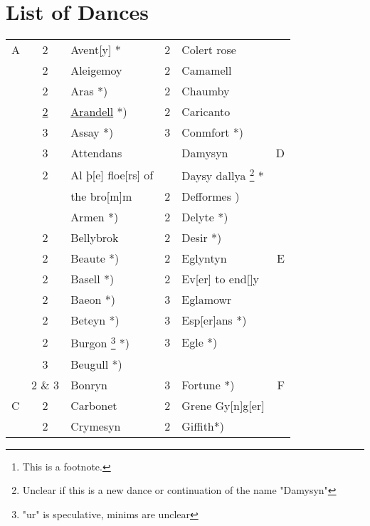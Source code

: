 \documentclass[12pt,letter]{article} %
\begin{document}
    \title{\rmfamily\normalfont{}}
    \author{}
    \date{} %
    
    \maketitle
    
    \begin{abstract}
        \noindent\lipsum[1] Just a test.\footnote{This is a footnote.}
    \end{abstract}
    \tableofcontents
\newpage
\section{List of Dances}
\begin{center}
\LARGE
\begin{tabular}{lcl clr}   %
A & 2 & Avent{[}y{]} *& 2 & Colert rose & \\
  & 2 & Aleigemoy & 2 & Camamell & \\
  & 2 & Aras *) & 2 & Chaumby & \\
  & \underline{2} & \underline{Arandell} *) & 2 & Caricanto & \\
  & 3 & Assay *) & 3 & Conmfort *) & \\
  & 3 & Attendans & & Damysyn & D \\
  & 2 & Al þ[e] floe[rs] of & & Daysy dallya \footnote{Unclear if this is a new dance or continuation of the name "Damysyn"} * & \\
  &   & the bro[m]m & 2 & Defformes ) & \\
  &   & Armen *) & 2 & Delyte *) & \\
  & 2 & Bellybrok & 2 & Desir *) & \\
  & 2 & Beaute *) & 2 & Eglyntyn & E \\
  & 2 & Basell *) & 2 & Ev[er] to end[]y & \\
  & 2 & Baeon *) & 3 & Eglamowr & \\
  & 2 & Beteyn *) & 3 & Esp[er]ans *) & \\
  & 2 & Burgon \footnote{"ur" is speculative, minims are unclear}  *) & 3 & Egle *) & \\
  & 3 & Beugull *)  \\
  & 2 \& 3 & Bonryn & 3 & Fortune *) & F \\
C & 2 & Carbonet & 2 & Grene Gy[n]g[er] & \\
  & 2 & Crymesyn & 2 & Giffith*) & \\

\end{tabular}
\end{center}
\end{document}
